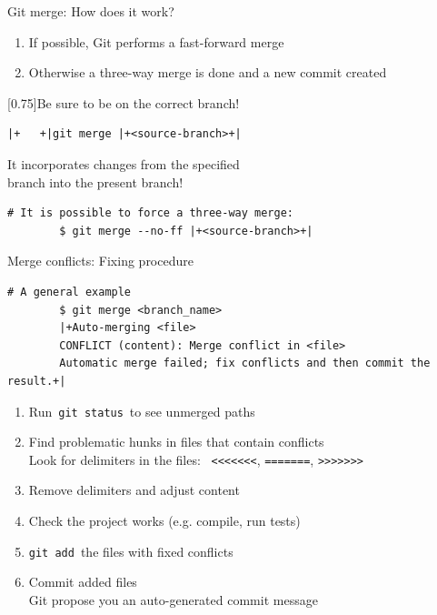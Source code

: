 \documentclass[usenames,svgnames,14pt]{beamer}
\newcommand{\then}{\raisebox{2pt}{$\;\drsh\;$}}
\begin{document}
\begin{frame}[fragile]{Git merge: How does it work?}
    \vspace{-3mm}
    \setlength{\leftmargini}{5mm}
    \begin{enumerate}
        \item If possible, Git performs a fast-forward merge
        \item Otherwise a three-way merge is done and a new commit created
    \end{enumerate}
    \begin{varblock}{}[0.75\textwidth]{Be sure to be on the correct branch!}
        \begin{lstlisting}[style=MyBash, xrightmargin=11mm, xleftmargin=11mm, aboveskip=2mm]
            |+   +|git merge |+<source-branch>+|
        \end{lstlisting}
        It incorporates changes from the specified\\ branch into the present branch!
    \end{varblock}
    \vspace{3mm}
    \begin{lstlisting}[style=MyBash]
        # It is possible to force a three-way merge:
        $ git merge --no-ff |+<source-branch>+|
    \end{lstlisting}
\end{frame}
\begin{frame}[fragile]{Merge conflicts: Fixing procedure}
    \begin{lstlisting}[style=MyBash, xleftmargin=-1mm, xrightmargin=-1mm]
        # A general example
        $ git merge <branch_name>
        |+Auto-merging <file>
        CONFLICT (content): Merge conflict in <file>
        Automatic merge failed; fix conflicts and then commit the result.+|
    \end{lstlisting}
    \vspace{3mm}
    \begin{enumerate}
        \small
        \item Run \,\texttt{git status}\, to see \alert{unmerged paths}
        \item Find problematic hunks in files that contain conflicts\\
              \then Look for delimiters in the files:
              {~\footnotesize\texttt{<<<<<<<},\; \texttt{=======},\; \texttt{>>>>>>>}}
        \item Remove delimiters and adjust content
        \item Check the project works (e.g. compile, run tests)
        \item \texttt{git add}\, the files with fixed conflicts
        \item Commit added files\\
              \then Git propose you an auto-generated commit message
    \end{enumerate}
\end{frame}
\end{document}
